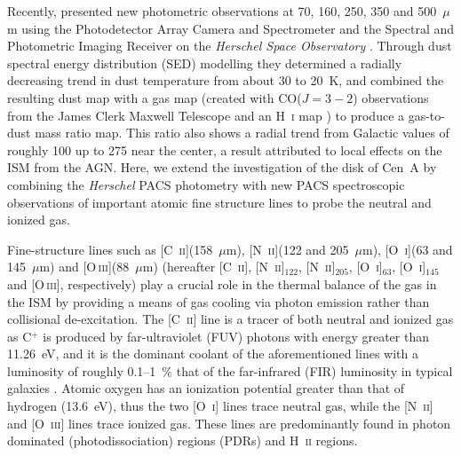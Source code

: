 Recently, \citet{2012MNRAS.422.2291P} presented new photometric observations at 70, 160, 250, 350 and 500~$\mu$m using the Photodetector Array Camera and Spectrometer \citep[PACS;][]{2010A&A...518L...2P} and the Spectral and Photometric Imaging Receiver \citep[SPIRE;][]{2010A&A...518L...3G} on the \emph{Herschel Space Observatory} \citep{2010A&A...518L...1P}.  Through dust spectral energy distribution (SED) modelling they determined a radially decreasing trend in dust temperature from about 30 to 20~K, and combined the resulting dust map with a gas map (created with CO($J=3-2$) observations from the James Clerk Maxwell Telescope and an H~\textsc{i} map \citep{2010A&A...515A..67S}) to produce a gas-to-dust mass ratio map.  This ratio also shows a radial trend from Galactic values of roughly 100 up to 275 near the center, a result attributed to local effects on the ISM from the AGN.  Here, we extend the investigation of the disk of Cen~A by combining the \emph{Herschel} PACS photometry with new PACS spectroscopic observations of important atomic fine structure lines to probe the neutral and ionized gas.

Fine-structure lines such as [C~\textsc{ii}](158~$\mu$m), [N~\textsc{ii}](122 and 205~$\mu$m), [O~\textsc{i}](63 and 145~$\mu$m) and [O\,\textsc{iii}](88~$\mu$m) (hereafter [C~\textsc{ii}], [N~\textsc{ii}]$_{122}$, [N~\textsc{ii}]$_{205}$, [O~\textsc{i}]$_{63}$, [O~\textsc{i}]$_{145}$ and [O\,\textsc{iii}], respectively) play a crucial role in the thermal balance of the gas in the ISM by providing a means of gas cooling via photon emission rather than collisional de-excitation.  The [C~\textsc{ii}] line is a tracer of both neutral and ionized gas as C$^{+}$ is produced by far-ultraviolet (FUV) photons with energy greater than 11.26~eV, and it is the dominant coolant of the aforementioned lines with a luminosity of roughly 0.1--1~\% that of the far-infrared (FIR) luminosity in typical galaxies \citep[e.g.][]{1985ApJ...289..803S, 1993ApJ...404..219S, 2001ApJ...561..766M, 2011ApJ...728L...7G, parkin_2013}.  Atomic oxygen has an ionization potential greater than that of hydrogen (13.6~eV), thus the two [O~\textsc{i}] lines trace neutral gas, while the [N~\textsc{ii}] and [O~\textsc{iii}] lines trace ionized gas.  These lines are predominantly found in photon dominated (photodissociation) regions (PDRs) and H~\textsc{ii} regions.

